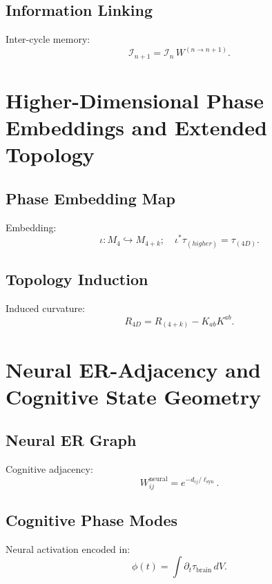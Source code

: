 \section{Information Linking}
Inter-cycle memory:
\[
\mathcal{I}_{n+1} = \mathcal{I}_{n}\,W^{(n\rightarrow n+1)}.
\]



\chapter{Higher-Dimensional Phase Embeddings and Extended Topology}

\section{Phase Embedding Map}
Embedding:
\[
\iota: M_4 \hookrightarrow M_{4+k};\quad \iota^\ast \tau_{(higher)} = \tau_{(4D)}.
\]

\section{Topology Induction}
Induced curvature:
\[
R_{4D} = R_{(4+k)} - K_{ab}K^{ab}.
\]



\chapter{Neural ER-Adjacency and Cognitive State Geometry}

\section{Neural ER Graph}
Cognitive adjacency:
\[
W_{ij}^{\mathrm{neural}} = e^{-d_{ij}/\ell_{\mathrm{syn}}}.
\]

\section{Cognitive Phase Modes}
Neural activation encoded in:
\[
\phi(t) = \int \partial_t\tau_{\mathrm{brain}}\, dV.
\]

